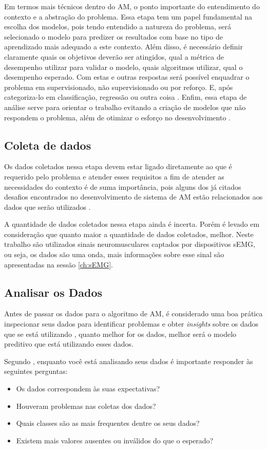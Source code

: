 Em termos mais técnicos dentro do AM, o ponto importante do entendimento do contexto e a abstração do problema. Essa etapa tem um papel fundamental na escolha dos modelos, pois tendo entendido a natureza do problema, será selecionado o modelo para predizer os resultados com base no tipo de aprendizado mais adequado a este contexto. Além disso, é necessário definir claramente quais os objetivos deverão ser atingidos, qual a métrica de desempenho utilizar para validar o modelo, quais algoritmos utilizar, qual o desempenho esperado. Com estas e outras respostas será possível enquadrar o problema em supervisionado, não supervisionado ou por reforço. E, após categoriza-lo em classificação, regressão ou outra coisa \cite{geron2017hands}. Enfim, essa etapa de análise serve para orientar o trabalho evitando a criação de modelos que não respondem o problema, além de otimizar o esforço no desenvolvimento \cite{Amazon}.

\subsection{Coleta de dados}

Os dados coletados nessa etapa devem estar ligado diretamente ao que é requerido pelo problema e atender esses requisitos a fim de atender as necessidades do contexto é de suma importância, pois alguns dos já citados desafios encontrados no desenvolvimento de sistema de AM estão relacionados aos dados que serão utilizados \cite{geron2017hands}.

A quantidade de dados coletados nessa etapa ainda é incerta. Porém é levado em consideração que quanto maior a quantidade de dados coletados, melhor. Neste trabalho são utilizados sinais neuromusculares captados por dispositivos sEMG, ou seja, os dados são uma onda, mais informações sobre esse sinal são apresentadas na sessão \ref{ch:sEMG}.

\subsection{Analisar os Dados}

Antes de passar os dados para o algoritmo de AM, é considerado uma boa prática inspecionar seus dados para identificar problemas e obter \textit{insights} sobre os dados que se está utilizando \cite{Amazon}, quanto melhor for os dados, melhor será o modelo preditivo que está utilizando esses dados.

Segundo , enquanto você está analisando seus dados é importante responder às seguintes perguntas:
\begin{itemize}
	\item Os dados correspondem às suas expectativas?
	\item Houveram problemas nas coletas dos dados?
	\item Quais classes são as mais frequentes dentre os seus dados?
	\item Existem mais valores ausentes ou inválidos do que o esperado?
\end{itemize}

